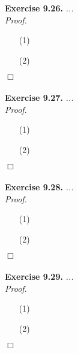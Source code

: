 \documentclass{article}
\begin{document}



\textbf{Exercise 9.26.}
\emph{...} \\

\emph{Proof.}
\begin{enumerate}
\item[(1)]
\item[(2)]

\end{enumerate}
$\Box$ \\\\






\textbf{Exercise 9.27.}
\emph{...} \\

\emph{Proof.}
\begin{enumerate}
\item[(1)]
\item[(2)]

\end{enumerate}
$\Box$ \\\\






\textbf{Exercise 9.28.}
\emph{...} \\

\emph{Proof.}
\begin{enumerate}
\item[(1)]
\item[(2)]

\end{enumerate}
$\Box$ \\\\






\textbf{Exercise 9.29.}
\emph{...} \\

\emph{Proof.}
\begin{enumerate}
\item[(1)]
\item[(2)]

\end{enumerate}
$\Box$ \\\\
\end{document}
